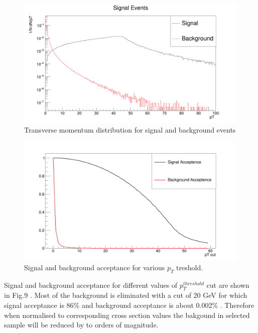 \documentclass{article}		%
\begin{document}
\begin{figure}[h]
	\begin{center}
		\includegraphics[scale=0.17]{pT.png} 
		\caption{Transverse momentum distribution for signal and background events}		
	\end{center}
	\centering	
\end{figure}						    
\begin{figure}[h]
	\begin{center}
		\includegraphics[scale=0.17]{acceptence.png} 	
		\caption{Signal and background acceptance for various $p_T$ treshold.}		
	\end{center}
	\centering	
\end{figure}						    

Signal and background acceptance for different values of  $p_T^{threshold}$ cut are shown in Fig.9 . Most of the background is eliminated with a cut of 20 GeV for which signal acceptance is 86$\%$ and background acceptance is about 0.002$\%$ . Therefore when normalised to corresponding cross section values the bakgound in selected sample will be reduced by to orders of magnitude. 
\end{document}
